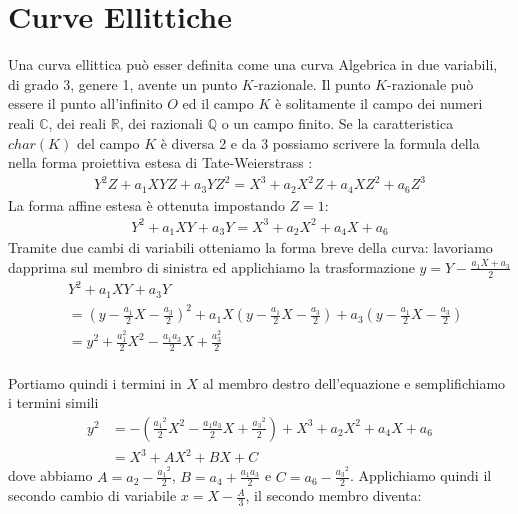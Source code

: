 \documentclass[a4paper,12pt]{tesiinfo}
\newcommand\ddfrac[2]{\frac{\displaystyle #1}{\displaystyle #2}}
\begin{document}
\chapter{Curve Ellittiche}
Una curva ellittica pu\`o esser definita come una curva Algebrica in due variabili, di grado 3, genere 1, avente un punto $K$-razionale. Il punto $K$-razionale pu\`o essere il punto all'infinito $O$ ed il campo $K$ \`e solitamente il campo dei numeri reali $\mathbb{C}$, dei reali $\mathbb{R}$, dei razionali $\mathbb{Q}$ o un campo finito. Se la caratteristica $char(K)$ del campo $K$ \`e diversa 2 e da 3 possiamo scrivere la formula della nella forma proiettiva estesa di Tate-Weierstrass :
\begin{gather}
Y^{2}Z + a_1XYZ + a_3YZ^2 =X^3 + a_2X^2Z + a_4XZ^2 + a_6Z^3
\end{gather}
La forma affine estesa \`e ottenuta impostando $Z=1$: 
\begin{gather}
Y^{2} + a_1XY + a_3Y =X^3 + a_2X^2 + a_4X + a_6
\end{gather}
Tramite due cambi di variabili otteniamo la forma breve della curva: lavoriamo dapprima sul membro di sinistra ed applichiamo la trasformazione $y = Y - \ddfrac{a_1X + a_3}{2}$
\begin{align*}
&Y^{2} + a_1XY + a_3Y 
\\ 
&= \left ( y - \ddfrac{a_1}{2}X - \ddfrac{a_3}{2} \right )^2 + a_1X \left ( y - \ddfrac{a_1}{2}X - \ddfrac{a_3}{2} \right ) + a_3 \left ( y - \ddfrac{a_1}{2}X - \ddfrac{a_3}{2} \right ) 
\\
&= y^2 + \ddfrac{a_1^2}{2}X^2 - \ddfrac{a_1a_3}{2}X +\ddfrac{a_3^2}{2} 
\end{align*}
\\
Portiamo quindi i termini in $X$ al membro destro dell'equazione e semplifichiamo i termini simili
\begin{align*}
y^2 &= - \left ( \ddfrac{{a_1}^2}{2}X^2 - \ddfrac{a_1a_3}{2}X +\ddfrac{{a_3}^2}{2} \right ) + X^3 + a_2X^2 + a_4X + a_6
\\
&= X^3 + AX^2 + BX + C 
\end{align*}
dove abbiamo $A = a_2 - \ddfrac{{a_1}^2}{2}$, $B = a_4 + \ddfrac{a_1a_3}{2}$ e $C = a_6 - \ddfrac{{a_3}^2}{2}$.
Applichiamo quindi il secondo cambio di variabile $x = X - \ddfrac{A}{3}$, il secondo membro diventa:
\end{document}
